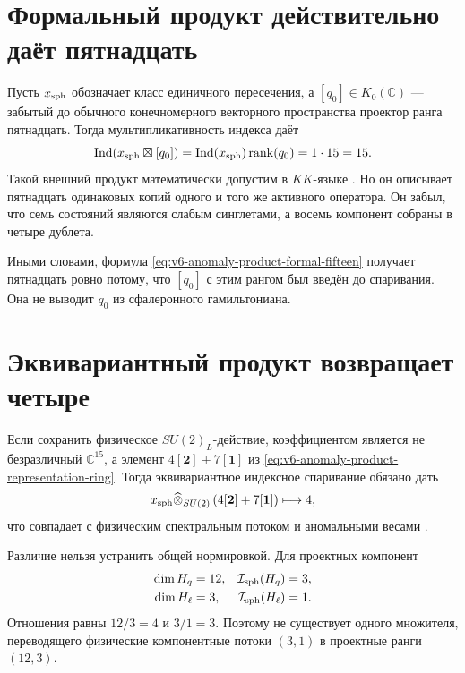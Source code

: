 \section{Формальный продукт действительно даёт пятнадцать}

Пусть $x_{\rm sph}$ обозначает класс единичного пересечения, а
$[q_0]\in K_0(\mathbb C)$ --- забытый до обычного конечномерного
векторного пространства проектор ранга пятнадцать. Тогда
мультипликативность индекса даёт
\begin{equation}
 \operatorname{Ind}(x_{\rm sph}\boxtimes[q_0])
 =\operatorname{Ind}(x_{\rm sph})\operatorname{rank}(q_0)=1\cdot15=15.
 \label{eq:v6-anomaly-product-formal-fifteen}
\end{equation}
Такой внешний продукт математически допустим в $KK$-языке
\cite{anomaly-product-kasparov1981}. Но он описывает пятнадцать
одинаковых копий одного и того же активного оператора. Он забыл, что
семь состояний являются слабым синглетами, а восемь компонент собраны в
четыре дублета.

Иными словами, формула \eqref{eq:v6-anomaly-product-formal-fifteen}
получает пятнадцать ровно потому, что $[q_0]$ с этим рангом был введён
до спаривания. Она не выводит $q_0$ из сфалеронного гамильтониана.

\section{Эквивариантный продукт возвращает четыре}

Если сохранить физическое $SU(2)_L$-действие, коэффициентом является не
безразличный $\mathbb C^{15}$, а элемент
$4[\mathbf2]+7[\mathbf1]$ из \eqref{eq:v6-anomaly-product-representation-ring}.
Тогда эквивариантное индексное спаривание обязано дать
\begin{equation}
 x_{\rm sph}\widehat\otimes_{SU(2)}
 \left(4[\mathbf2]+7[\mathbf1]\right)
 \longmapsto 4,
\end{equation}
что совпадает с физическим спектральным потоком и аномальными весами
\cite{anomaly-product-klinkhamer-rupp2003}.

Различие нельзя устранить общей нормировкой. Для проектных компонент
\begin{align}
 \dim H_q&=12, & \mathcal I_{\rm sph}(H_q)&=3,\\
 \dim H_\ell&=3, & \mathcal I_{\rm sph}(H_\ell)&=1.
\end{align}
Отношения равны $12/3=4$ и $3/1=3$. Поэтому не существует одного
множителя, переводящего физические компонентные потоки $(3,1)$ в
проектные ранги $(12,3)$.

